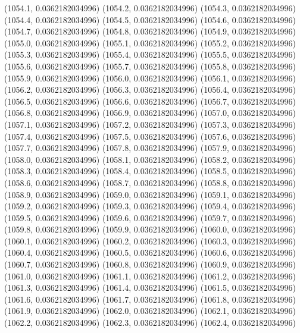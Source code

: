 {					(1054.1, 0.0362182034996)
					(1054.2, 0.0362182034996)
					(1054.3, 0.0362182034996)
					(1054.4, 0.0362182034996)
					(1054.5, 0.0362182034996)
					(1054.6, 0.0362182034996)
					(1054.7, 0.0362182034996)
					(1054.8, 0.0362182034996)
					(1054.9, 0.0362182034996)
					(1055.0, 0.0362182034996)
					(1055.1, 0.0362182034996)
					(1055.2, 0.0362182034996)
					(1055.3, 0.0362182034996)
					(1055.4, 0.0362182034996)
					(1055.5, 0.0362182034996)
					(1055.6, 0.0362182034996)
					(1055.7, 0.0362182034996)
					(1055.8, 0.0362182034996)
					(1055.9, 0.0362182034996)
					(1056.0, 0.0362182034996)
					(1056.1, 0.0362182034996)
					(1056.2, 0.0362182034996)
					(1056.3, 0.0362182034996)
					(1056.4, 0.0362182034996)
					(1056.5, 0.0362182034996)
					(1056.6, 0.0362182034996)
					(1056.7, 0.0362182034996)
					(1056.8, 0.0362182034996)
					(1056.9, 0.0362182034996)
					(1057.0, 0.0362182034996)
					(1057.1, 0.0362182034996)
					(1057.2, 0.0362182034996)
					(1057.3, 0.0362182034996)
					(1057.4, 0.0362182034996)
					(1057.5, 0.0362182034996)
					(1057.6, 0.0362182034996)
					(1057.7, 0.0362182034996)
					(1057.8, 0.0362182034996)
					(1057.9, 0.0362182034996)
					(1058.0, 0.0362182034996)
					(1058.1, 0.0362182034996)
					(1058.2, 0.0362182034996)
					(1058.3, 0.0362182034996)
					(1058.4, 0.0362182034996)
					(1058.5, 0.0362182034996)
					(1058.6, 0.0362182034996)
					(1058.7, 0.0362182034996)
					(1058.8, 0.0362182034996)
					(1058.9, 0.0362182034996)
					(1059.0, 0.0362182034996)
					(1059.1, 0.0362182034996)
					(1059.2, 0.0362182034996)
					(1059.3, 0.0362182034996)
					(1059.4, 0.0362182034996)
					(1059.5, 0.0362182034996)
					(1059.6, 0.0362182034996)
					(1059.7, 0.0362182034996)
					(1059.8, 0.0362182034996)
					(1059.9, 0.0362182034996)
					(1060.0, 0.0362182034996)
					(1060.1, 0.0362182034996)
					(1060.2, 0.0362182034996)
					(1060.3, 0.0362182034996)
					(1060.4, 0.0362182034996)
					(1060.5, 0.0362182034996)
					(1060.6, 0.0362182034996)
					(1060.7, 0.0362182034996)
					(1060.8, 0.0362182034996)
					(1060.9, 0.0362182034996)
					(1061.0, 0.0362182034996)
					(1061.1, 0.0362182034996)
					(1061.2, 0.0362182034996)
					(1061.3, 0.0362182034996)
					(1061.4, 0.0362182034996)
					(1061.5, 0.0362182034996)
					(1061.6, 0.0362182034996)
					(1061.7, 0.0362182034996)
					(1061.8, 0.0362182034996)
					(1061.9, 0.0362182034996)
					(1062.0, 0.0362182034996)
					(1062.1, 0.0362182034996)
					(1062.2, 0.0362182034996)
					(1062.3, 0.0362182034996)
					(1062.4, 0.0362182034996)
}
